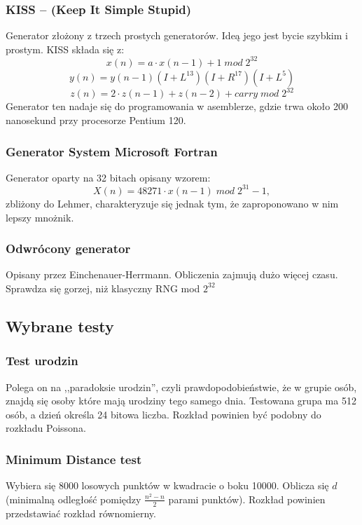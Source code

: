 \documentclass[11pt]{aghdpl}
\begin{document}
\subsubsection{KISS – (Keep It Simple Stupid)}
Generator złożony z trzech prostych generatorów. Ideą jego jest bycie szybkim i prostym. KISS składa się z:
\begin{equation}
x(n) = a \cdot x (n-1)+1 \; mod \; 2^{32}
\end{equation}
\begin{equation}
y(n)=y(n-1)(I+L^{13})(I+R^{17})(I+L^5)
\end{equation}
\begin{equation}
z(n)=2 \cdot z(n-1)+z(n-2) +carry \; mod \; 2^{32}
\end{equation}
Generator ten nadaje się do programowania w asemblerze, gdzie trwa około 200 nanosekund przy procesorze Pentium 120.
\subsubsection{Generator System Microsoft Fortran}
Generator oparty na 32 bitach opisany wzorem:
\begin{equation}
X ( n ) = 48271 \cdot x (n- 1 )\; mod\; 2 ^ {31}-1,
\end{equation}
zbliżony do Lehmer, charakteryzuje się jednak tym, że zaproponowano w nim lepszy mnożnik. 
\subsubsection{Odwrócony generator}
Opisany przez Einchenauer-Herrmann. Obliczenia zajmują dużo więcej czasu. Sprawdza się gorzej, niż klasyczny RNG mod $2^{32}$
\subsection{Wybrane testy}
\subsubsection{Test urodzin}
Polega on na ,,paradoksie urodzin'', czyli prawdopodobieństwie, że w grupie osób, znajdą się osoby które mają urodziny tego samego dnia. Testowana grupa ma 512 osób, a dzień określa 24 bitowa liczba. Rozkład powinien być podobny do rozkładu Poissona.
\subsubsection{Minimum Distance test}
Wybiera się 8000 losowych punktów w kwadracie o boku 10000. Oblicza się $d$ (minimalną odległość pomiędzy $\frac{n^2 -n}{2}$ parami punktów). Rozkład powinien przedstawiać rozkład równomierny.
\end{document}
